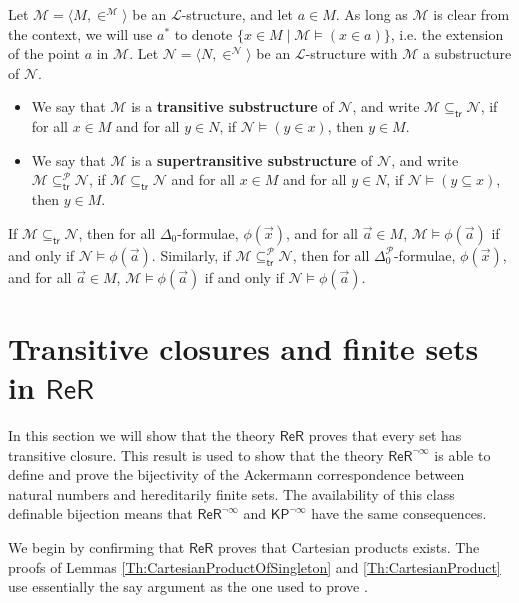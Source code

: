 \documentclass[11pt, a4paper]{article}
\newcounter{Prop1}
\begin{document}
Let $\mathcal{M}= \langle M, \in^{\mathcal{M}} \rangle$ be an $\mathcal{L}$-structure, and let $a \in M$. As long as $\mathcal{M}$ is clear from the context, we will use $a^*$ to denote $\{x \in M \mid \mathcal{M} \models (x \in a)\}$, i.e. the extension of the point $a$ in $\mathcal{M}$. Let $\mathcal{N}= \langle N, \in^{\mathcal{N}} \rangle$ be an $\mathcal{L}$-structure with $\mathcal{M}$ a substructure of $\mathcal{N}$.
\begin{itemize}
\item We say that $\mathcal{M}$ is a {\bf transitive substructure} of $\mathcal{N}$, and write $\mathcal{M} \subseteq_{\mathsf{tr}} \mathcal{N}$, if for all $x \in M$ and for all $y \in N$, if $\mathcal{N} \models (y \in x)$, then $y \in M$. 
\item We say that $\mathcal{M}$ is a {\bf supertransitive substructure} of $\mathcal{N}$, and write $\mathcal{M} \subseteq_{\mathsf{tr}}^{\mathcal{P}} \mathcal{N}$, if $\mathcal{M} \subseteq_{\mathsf{tr}} \mathcal{N}$ and for all $x \in M$ and for all $y \in N$, if $\mathcal{N} \models (y \subseteq x)$, then $y \in M$.   
\end{itemize}
If $\mathcal{M} \subseteq_{\mathsf{tr}} \mathcal{N}$, then for all  $\Delta_0$-formulae, $\phi(\vec{x})$, and for all $\vec{a} \in M$, $\mathcal{M} \models \phi(\vec{a})$ if and only if $\mathcal{N} \models \phi(\vec{a})$. Similarly, if $\mathcal{M} \subseteq_{\mathsf{tr}}^{\mathcal{P}} \mathcal{N}$, then for all  $\Delta_0^{\mathcal{P}}$-formulae, $\phi(\vec{x})$, and for all $\vec{a} \in M$, $\mathcal{M} \models \phi(\vec{a})$ if and only if $\mathcal{N} \models \phi(\vec{a})$.  

\section[TCo in ReR]{Transitive closures and finite sets in $\mathsf{ReR}$} \label{Sec:TCoAndFiniteSets}

In this section we will show that the theory $\mathsf{ReR}$ proves that every set has transitive closure. This result is used to show that the theory $\mathsf{ReR}^{\neg \infty}$ is able to define and prove the bijectivity of the Ackermann correspondence between natural numbers and hereditarily finite sets. The availability of this class definable bijection means that $\mathsf{ReR}^{\neg \infty}$ and $\mathsf{KP}^{\neg \infty}$ have the same consequences. 

We begin by confirming that $\mathsf{ReR}$ proves that Cartesian products exists. The proofs of Lemmas \ref{Th:CartesianProductOfSingleton} and \ref{Th:CartesianProduct} use essentially the say argument as the one used to prove \cite[Proposition I.3.2]{bar75}. 
\end{document}
